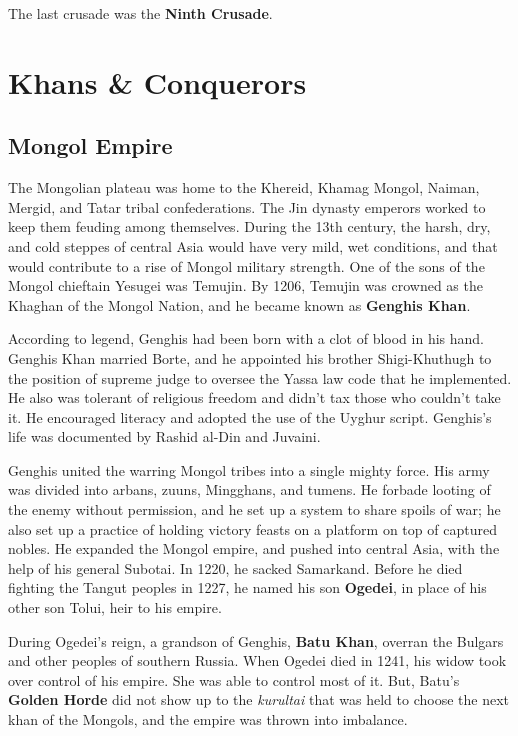 The last crusade was the \textbf{Ninth Crusade}.

\section{Khans \& Conquerors}

\subsection*{Mongol Empire}

The Mongolian plateau was home to the Khereid, Khamag Mongol, Naiman, Mergid, and Tatar tribal confederations.
The Jin dynasty emperors worked to keep them feuding among themselves.
During the 13th century, the harsh, dry, and cold steppes of central Asia would have very mild, wet conditions,
and that would contribute to a rise of Mongol military strength.
One of the sons of the Mongol chieftain Yesugei was Temujin.
By 1206, Temujin was crowned as the Khaghan of the Mongol Nation,
and he became known as \textbf{Genghis Khan}.

According to legend, Genghis had been born with a clot of blood in his hand.
Genghis Khan married Borte,
and he appointed his brother Shigi-Khuthugh to the position of supreme judge
to oversee the Yassa law code that he implemented.
He also was tolerant of religious freedom and didn't tax those who couldn't take it.
He encouraged literacy and adopted the use of the Uyghur script.
Genghis's life was documented by Rashid al-Din and Juvaini.

Genghis united the warring Mongol tribes into a single mighty force.
His army was divided into arbans, zuuns, Mingghans, and tumens.
He forbade looting of the enemy without permission, and he set up a system to share spoils of war;
he also set up a practice of holding victory feasts on a platform on top of captured nobles.
He expanded the Mongol empire, and pushed into central Asia, with the help of his general Subotai.
In 1220, he sacked Samarkand.
Before he died fighting the Tangut peoples in 1227,
he named his son \textbf{Ogedei}, in place of his other son Tolui, heir to his empire.

During Ogedei's reign, a grandson of Genghis, \textbf{Batu Khan},
overran the Bulgars and other peoples of southern Russia.
When Ogedei died in 1241, his widow took over control of his empire.
She was able to control most of it.
But, Batu's \textbf{Golden Horde} did not show up to the
\textit{kurultai} that was held to choose the next khan of the Mongols,
and the empire was thrown into imbalance.

